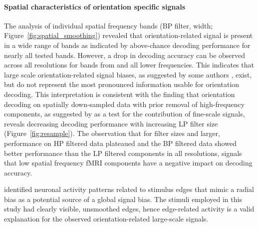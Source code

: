 \paragraph*{Spatial characteristics of orientation specific signals}
%
The analysis of individual spatial frequency bands (BP filter,  width;
Figure~\ref{fig:spatial_smoothing}) revealed that orientation-related signal is
present in a wide range of bands as indicated by above-chance decoding
performance for nearly all tested bands. However, a drop in decoding accuracy
can be observed across all resolutions for bands from  and all
lower frequencies. This indicates that large scale orientation-related signal
biases, as suggested by some authors \citep{opdebeeck_2010,freeman_2011}, exist,
but do not represent the most pronounced information usable for orientation
decoding. This interpretation is consistent with the finding that orientation
decoding on spatially down-sampled data with prior removal of high-frequency
components, as suggested by \cite{freeman_2013} as a test for the contribution
of fine-scale signals, reveals decreasing decoding performance with increasing
LP filter size (Figure~\ref{fig:resample}).
%
The observation that for filter sizes  and larger, performance on HP
filtered data plateaued and the BP filtered data showed better performance than
the LP filtered components in all resolutions, signals that low spatial
frequency fMRI components have a negative impact on decoding accuracy.

\cite{carlson_2014} identified neuronal activity patterns related to stimulus
edges that mimic a radial bias as a potential source of a global signal bias.
The stimuli employed in this study had clearly visible, unsmoothed edges, hence
edge-related activity is a valid explanation for the observed
orientation-related large-scale signals.

